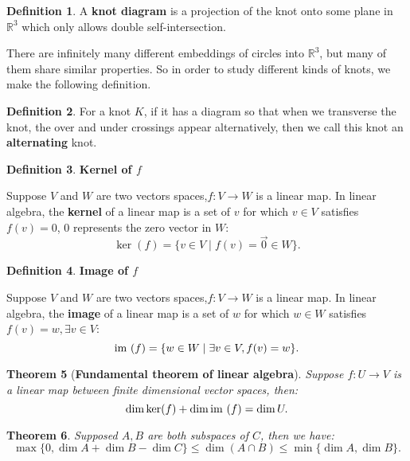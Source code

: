 \documentclass{amsart}
\newtheorem{thm}{Theorem}[section]
\theoremstyle{definition}
\newtheorem{defn}[thm]{Definition}
\newcommand{\im}{{\rm im~}}
\begin{document}
\begin{defn}
A {\bf knot diagram} is a projection of the knot onto some plane in $\mathbb{R}^3$ which only allows double self-intersection.
\end{defn}
There are infinitely many different embeddings of circles into $\mathbb{R}^3$, but many of them share similar properties. So in order to study different kinds of knots, we make the following definition.

\begin{defn}
For a knot $K$, if it has a diagram so that when we transverse the knot, the over and under crossings appear alternatively, then we call this knot an {\bf alternating} knot.
\end{defn}


\begin{defn}
{\bf Kernel of $f$}
\end{defn}
Suppose $V$ and $W$ are two vectors spaces,$f:V\rightarrow W$ is a linear map. In linear algebra, the {\bf kernel} of a linear map is a set of $v$ for which $v \in V$ satisfies $f(v)=0$, $0$ represents the zero vector in $W$:
\[\ker (f)= \{v\in V\mid f(v)=\vec{0} \in W\}.\]

\begin{defn}
{\bf Image of $f$}
\end{defn}
Suppose $V$ and $W$ are two vectors spaces,$f:V\rightarrow W$ is a linear map. In linear algebra, the {\bf image} of a linear map is a set of $w$ for which $w \in W$ satisfies $f(v)=w,\exists v \in V$:
\[\im (f)= \{w\in W \mid\exists v\in V,f(v)= w\}.\]

\begin{thm}[{\bf Fundamental theorem of linear algebra}]
Suppose $f:U\rightarrow V$ is a linear map between finite dimensional vector spaces, then:
\[\dim \ker (f)+\dim \im (f)=\dim U.\]
\end{thm}

\begin{thm} \label{thm: A}
Supposed $A, B$ are both subspaces of $C$, then we have:
\[\max\{0,\dim A+\dim B-\dim C\}\leq \dim(A\cap B)\leq \min\{\dim A, \dim B\}.\]
\end{thm}
\end{document}
